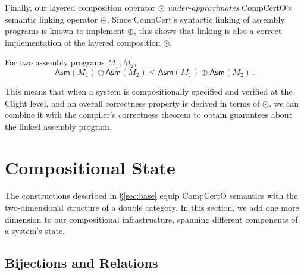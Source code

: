 \documentclass[acmsmall,screen,review,anonymous]{acmart}
\newcommand{\kw}[1]{\ensuremath{ \mathsf{#1} }}
\begin{document}
Finally,
our layered composition operator $\odot$
\emph{under-approximates}
CompCertO's semantic linking operator $\oplus$.
Since CompCert's syntactic linking of assembly programs
is known to implement $\oplus$,
this shows that linking is also a correct implementation of
the layered composition $\odot$.

\begin{theorem}
For two assembly programs $M_1, M_2$,
\[
  \kw{Asm}(M_1) \odot \kw{Asm}(M_2)
  \le
  \kw{Asm}(M_1) \oplus \kw{Asm}(M_2)
 \,.
\]
\end{theorem}

This means that when a system is compositionally
specified and verified at the Clight level,
and an overall correctness property is derived
in terms of $\odot$,
we can combine it with the compiler's correctness theorem
to obtain guarantees about the linked assembly program.



\section{Compositional State} \label{sec:scomp} %

The constructions described in \S\ref{sec:base}
equip CompCertO semantics
with the two-dimensional structure of a double category.
In this section,
we add one more dimension to our compositional infrastructure,
spanning different components of a system's state.

%
%

\subsection{Bijections and Relations} %
\end{document}
